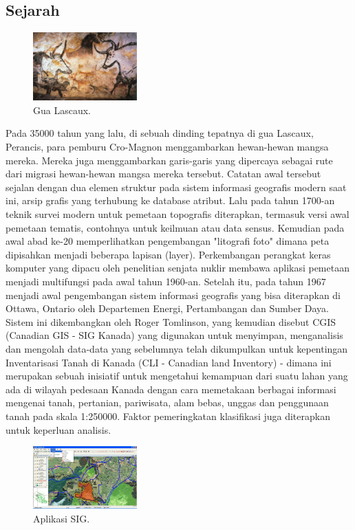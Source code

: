 \subsection{Sejarah}
\begin{figure}[H]
	\includegraphics[width=4cm]{figures/1174006/1174006gua1.jpg}
	\centering
	\caption{Gua Lascaux.}
\end{figure}
Pada 35000 tahun yang lalu, di sebuah dinding tepatnya di gua Lascaux, Perancis, para pemburu Cro-Magnon menggambarkan hewan-hewan mangsa mereka. Mereka juga menggambarkan garis-garis yang dipercaya sebagai rute dari migrasi hewan-hewan mangsa mereka tersebut. Catatan awal tersebut sejalan dengan dua elemen struktur pada sistem informasi geografis modern saat ini, arsip grafis yang terhubung ke database atribut. 
Lalu pada tahun 1700-an teknik survei modern untuk pemetaan topografis diterapkan, termasuk versi awal pemetaan tematis, contohnya untuk keilmuan atau data sensus. 
Kemudian pada awal abad ke-20 memperlihatkan pengembangan "litografi foto" dimana peta dipisahkan menjadi beberapa lapisan (layer). Perkembangan perangkat keras komputer yang dipacu oleh penelitian senjata nuklir membawa aplikasi pemetaan menjadi multifungsi pada awal tahun 1960-an. 
Setelah itu, pada tahun 1967 menjadi awal pengembangan sistem informasi geografis yang bisa diterapkan di Ottawa, Ontario oleh Departemen Energi, Pertambangan dan Sumber Daya. Sistem ini dikembangkan oleh Roger Tomlinson, yang kemudian disebut CGIS (Canadian GIS - SIG Kanada) yang digunakan untuk menyimpan, menganalisis dan mengolah data-data yang sebelumnya telah dikumpulkan untuk kepentingan Inventarisasi Tanah di Kanada (CLI - Canadian land Inventory) - dimana ini merupakan sebuah inisiatif untuk mengetahui kemampuan dari suatu lahan yang ada di wilayah pedesaan Kanada dengan cara memetakaan berbagai informasi mengenai tanah, pertanian, pariwisata, alam bebas, unggas dan penggunaan tanah pada skala 1:250000. Faktor pemeringkatan klasifikasi juga diterapkan untuk keperluan analisis.
\begin{figure}[H]
	\includegraphics[width=4cm]{figures/1174006/1174006sigapp1.jpg}
	\centering
	\caption{Aplikasi SIG.}
\end{figure}

